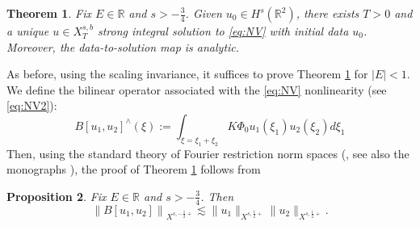 \documentclass[a4paper,
11pt,  reqno]{amsart}
\newcommand{\5}{\textup{V}}
\newtheorem{theorem}{Theorem} [section]
\newtheorem{proposition}[theorem]{Proposition}
\theoremstyle{remark}
\newcommand{\R}{\mathbb{R}}
\numberwithin{equation}{section}
\numberwithin{theorem}{section}
\begin{document}
\begin{theorem}\label{thm:s-34}
Fix $E\in \R$ and $s>-\frac34$. Given $u_0\in H^s(\R^2)$, there exists $T>0$ and a unique $u\in X^{s,b}_T$ strong integral solution to \eqref{eq:NV} with initial data $u_0$. Moreover, the data-to-solution map is analytic.
\end{theorem}


As before, using the scaling invariance, it suffices to prove Theorem \ref{thm:s-34} for $|E|<1$. We define the bilinear operator associated with the \eqref{eq:NV} nonlinearity (see \eqref{eq:NV2}):
$$
B[u_1,u_2]^\wedge(\xi):=\int_{\xi=\xi_1+\xi_2} K\Phi_0u_1(\xi_1)u_2(\xi_2)d\xi_1
$$
Then, using the standard theory of Fourier restriction norm spaces (\cite{bourg1,bourg2}, see also the monographs \cite{linaresponce, tao_book}), the proof of Theorem \ref{thm:s-34} follows from 

\begin{proposition}\label{prop:bilin_s-34}
Fix $E\in \R$ and $s>-\frac34$. Then
\begin{equation}\label{eq:bilin_s-34}
\left\| B[u_1,u_2]\right\|_{X^{s,-\frac12+}}\lesssim \|u_1\|_{X^{s,\frac12+}}\|u_2\|_{X^{s,\frac12+}}.
\end{equation}
\end{proposition}
\end{document}
